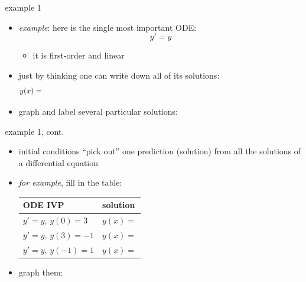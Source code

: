 \documentclass{beamer}
\begin{document}
\begin{frame}{example 1}

\begin{itemize}
\item \emph{example}: here is the single most important ODE:
    $$y' = y$$

\vspace{-4mm}
    \begin{itemize}
    \item it is first-order and linear
    \end{itemize}
\item just by thinking one can write down all of its solutions:
    $$y(x) = \hspace{5.0in}$$
\item graph and label several particular solutions:

\end{itemize}

\vfill
\end{frame}


\begin{frame}{example 1, cont.}

\begin{itemize}
\item initial conditions ``pick out'' one prediction (solution) from all the solutions of a differential equation
\item \emph{for example}, fill in the table:

\begin{tabular}{l|l}
ODE IVP & solution \phantom{sldafjdlkajf sd adsfkj asdf} \\ \hline
$y' = y, \, y(0)=3$ & $y(x)=$ \phantom{$\Big|$} \\ \hline
$y' = y, \, y(3)=-1$ & $y(x)=$ \phantom{$\Big|$} \\ \hline
$y' = y, \, y(-1)=1$ & $y(x)=$ \phantom{$\Big|$} \\ \hline
\end{tabular}

\smallskip
\item graph them:

\vspace{-5mm}
\end{itemize}

\vfill
\end{frame}
\end{document}

